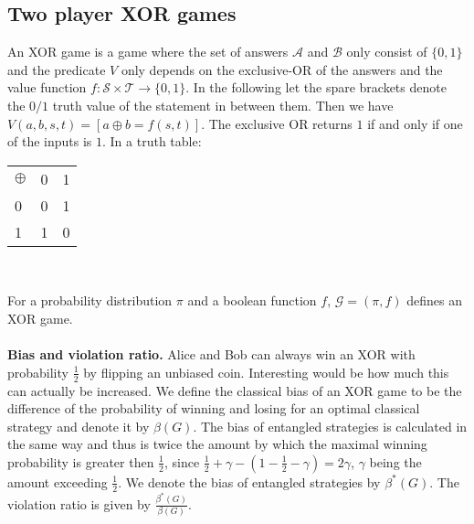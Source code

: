 \subsection{Two player XOR games}
An XOR game is a game where the set of answers $\mathcal{A}$ and $\mathcal{B}$ only consist of $\{ 0,1 \}$ and the predicate $V$ only depends on the exclusive-OR of the answers and the value function $f : \mathcal{S} \times \mathcal{T} \rightarrow \{ 0,1 \}$. In the following let the spare brackets denote the $0/1$ truth value of the statement in between them. Then we have $V(a,b,s,t) = \left[ a \oplus b = f(s,t) \right]$. 
The exclusive OR returns $1$ if and only if one of the inputs is $1$. In a truth table: \\
\begin{center}
\begin{tabular}{l | c r }
$\oplus$ & 0 & 1 \\
\cline{1-3} 

0 & 0 & 1 \\
1 & 1 & 0 
\end{tabular}\\
\end{center}

For a probability distribution $\pi$ and a boolean function $f$, $\mathcal{G}= (\pi, f)$ defines an XOR game.\\ \\
\textbf{Bias and violation ratio.} Alice and Bob can always win an XOR with probability $\frac{1}{2}$ by flipping an unbiased coin. Interesting would be how much this can actually be increased. We define the classical bias of an XOR game to be the difference of the probability of winning and losing for an optimal classical strategy and denote it by $\beta(G)$. The bias of entangled strategies is calculated in the same way and thus is twice the amount by which the maximal winning probability is greater then $\frac{1}{2}$, since $\frac{1}{2}+\gamma - (1 - \frac{1}{2} - \gamma) = 2 \gamma$, $\gamma$ being the amount exceeding $\frac{1}{2}$. We denote the bias of entangled strategies by $\beta^*(G)$. The violation ratio is given by $\frac{\beta^*(G)}{\beta(G)}$.\\ \\


